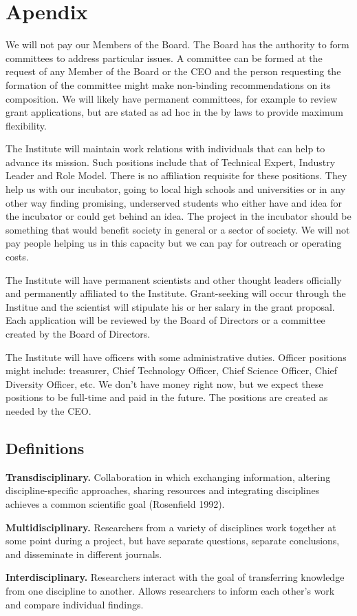 \section{Apendix}

We will not pay our Members of the Board. The Board has the authority to form committees to address particular issues. A committee can be formed at the request of any Member of the Board or the CEO and the person requesting the formation of the committee might make non-binding recommendations on its composition. We will likely have permanent committees, for example to review grant applications, but are stated as ad hoc in the by laws to provide maximum flexibility.

The Institute will maintain work relations with individuals that can help to advance its mission. Such positions include that of Technical Expert, Industry Leader and Role Model. There is no affiliation requisite for these positions. They help us with our incubator, going to local high schools and universities or in any other way finding promising, underserved students who either have and idea for the incubator or could get behind an idea. The project in the incubator should be something that would benefit society in general or a sector of society. We will not pay people helping us in this capacity but we can pay for outreach or operating costs.

The Institute will have permanent scientists and other thought leaders officially and permanently affiliated to the Institute. Grant-seeking will occur through the Institue and the scientist will stipulate his or her salary in the grant proposal. Each application will be reviewed by the Board of Directors or a committee created by the Board of Directors.

The Institute will have officers with some administrative duties. Officer positions might include: treasurer, Chief Technology Officer, Chief Science Officer, Chief Diversity Officer, etc. We don't have money right now, but we expect these positions to be full-time and paid in the future. The positions are created as needed by the CEO. 

\subsection{Definitions}

\textbf{Transdisciplinary.} Collaboration in which exchanging information, altering discipline-specific approaches, sharing resources and integrating disciplines achieves a common scientific goal (Rosenfield 1992).

\textbf{Multidisciplinary.} Researchers from a variety of disciplines work together at some point during a project, but have separate questions, separate conclusions, and disseminate in different journals.

\textbf{Interdisciplinary.} Researchers interact with the goal of transferring knowledge from one discipline to another. Allows researchers to inform each other’s work and compare individual findings.
    